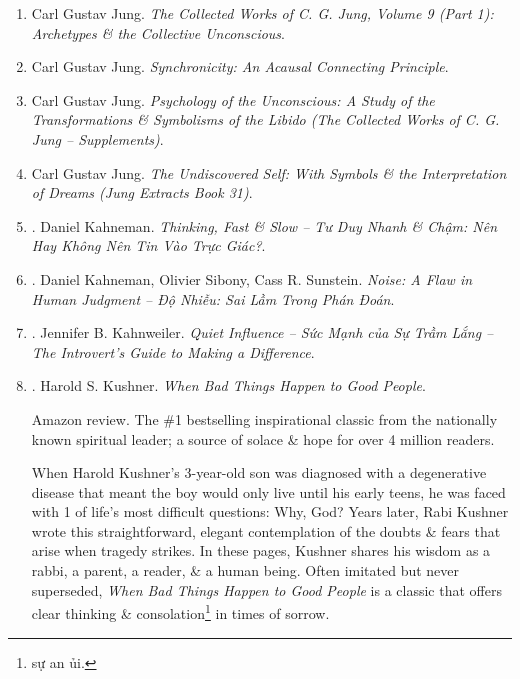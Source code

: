 \documentclass{article}
\begin{document}
\begin{enumerate}
	\item {\sc Carl Gustav Jung}. {\it The Collected Works of C. G. Jung, Volume 9 (Part 1): Archetypes \& the Collective Unconscious}.

	\item {\sc Carl Gustav Jung}. {\it Synchronicity: An Acausal Connecting Principle}.

	\item {\sc Carl Gustav Jung}. {\it Psychology of the Unconscious: A Study of the Transformations \& Symbolisms of the Libido (The Collected Works of C. G. Jung -- Supplements)}.

	\item {\sc Carl Gustav Jung}. {\it The Undiscovered Self: With Symbols \& the Interpretation of Dreams (Jung Extracts Book 31)}.

	\item \cite{Kahneman_think_fast_slow_VN}. {\sc Daniel Kahneman}. {\it Thinking, Fast \& Slow -- Tư Duy Nhanh \& Chậm: Nên Hay Không Nên Tin Vào Trực Giác?}.\hfill{\sf[done]}
	
	\item \cite{Kahneman_noise_VN}. {\sc Daniel Kahneman, Olivier Sibony, Cass R. Sunstein}. {\it Noise: A Flaw in Human Judgment -- Độ Nhiễu: Sai Lầm Trong Phán Đoán}.\hfill{\sf[done]}

	\item \cite{Kahnweiler2022}. Jennifer B. Kahnweiler. {\it Quiet Influence -- Sức Mạnh của Sự Trầm Lắng -- The Introvert's Guide to Making a Difference}.\hfill{\sf[done]}

	\item \cite{Kushner_bad_things_good_people}. {\sc Harold S. Kushner}. {\it When Bad Things Happen to Good People}. {}

	{\sf Amazon review.} The \#1 bestselling inspirational classic from the nationally known spiritual leader; a source of solace \& hope for over 4 million readers.

	When {\sc Harold Kushner}'s 3-year-old son was diagnosed with a degenerative disease that meant the boy would only live until his early teens, he was faced with 1 of life's most difficult questions: Why, God? Years later, {\sc Rabi Kushner} wrote this straightforward, elegant contemplation of the doubts \& fears that arise when tragedy strikes. In these pages, {\sc Kushner} shares his wisdom as a rabbi, a parent, a reader, \& a human being. Often imitated but never superseded, {\it When Bad Things Happen to Good People} is a classic that offers clear thinking \& consolation\footnote{sự an ủi.} in times of sorrow.


\end{enumerate}
\end{document}
